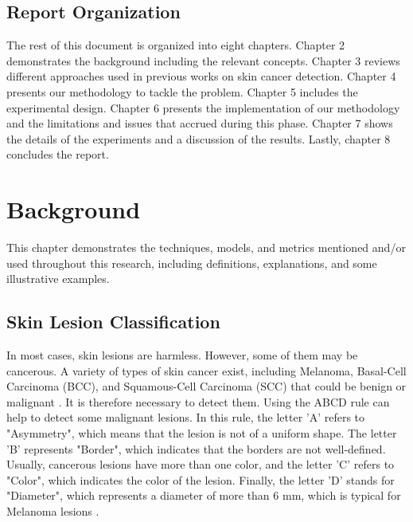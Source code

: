 \documentclass[12pt]{diazessay}
\begin{document}
    \subsection{Report Organization}
    \hspace{0.7cm} The rest of this document is organized into eight chapters. Chapter 2 demonstrates the background including the relevant concepts. Chapter 3 reviews different approaches used in previous works on skin cancer detection. Chapter 4 presents our methodology to tackle the problem. Chapter 5 includes the experimental design. Chapter 6 presents the implementation of our methodology and the limitations and issues that accrued during this phase. Chapter 7 shows the details of the experiments and a discussion of the results. Lastly, chapter 8 concludes the report.

    \newpage
    
    \section{Background}
    \hspace{0.7cm} This chapter demonstrates the techniques, models, and metrics mentioned and/or used throughout this research, including definitions, explanations, and some illustrative examples.
    
    \subsection{Skin Lesion Classification} 
    \hspace{0.7cm} In most cases, skin lesions are harmless. However, some of them may be cancerous. A variety of types of skin cancer exist, including Melanoma, Basal-Cell Carcinoma (BCC), and Squamous-Cell Carcinoma (SCC) that could be benign or malignant \cite{Armstrong2001-ir}\cite{rao1997can}. It is therefore necessary to detect them. Using the ABCD rule can help to detect some malignant lesions. In this rule, the letter 'A' refers to "Asymmetry", which means that the lesion is not of a uniform shape. The letter 'B' represents "Border", which indicates that the borders are not well-defined. Usually, cancerous lesions have more than one color, and the letter 'C' refers to "Color", which indicates the color of the lesion. Finally, the letter 'D' stands for "Diameter", which represents a diameter of more than 6 mm, which is typical for Melanoma lesions \cite{Thanh2020-rw}.
       
\end{document}
